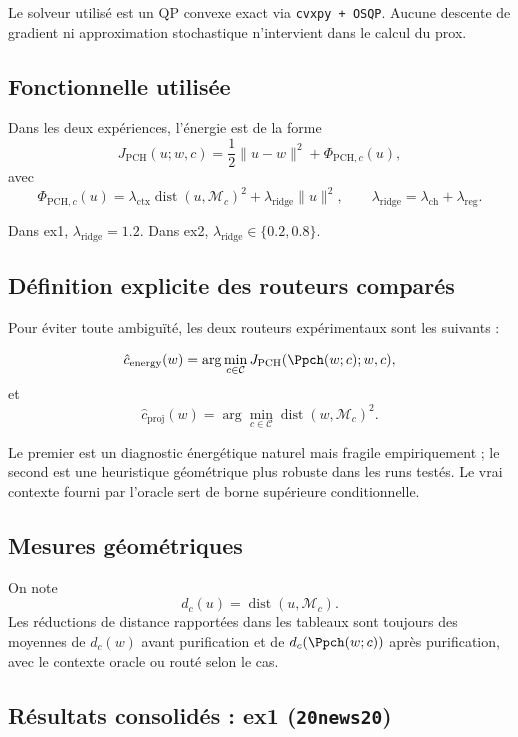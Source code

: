 Le solveur utilisé est un QP convexe exact via \texttt{cvxpy + OSQP}. Aucune descente de gradient ni approximation stochastique n’intervient dans le calcul du prox.

\subsection{Fonctionnelle utilisée}

Dans les deux expériences, l’énergie est de la forme
\[
J_{\mathrm{PCH}}(u;w,c)
=
\frac12\|u-w\|^2+\Phi_{\mathrm{PCH},c}(u),
\]
avec
\[
\Phi_{\mathrm{PCH},c}(u)
=
\lambda_{\mathrm{ctx}}\operatorname{dist}(u,\mathcal M_c)^2
+\lambda_{\mathrm{ridge}}\|u\|^2,
\qquad
\lambda_{\mathrm{ridge}}=\lambda_{\mathrm{ch}}+\lambda_{\mathrm{reg}}.
\]

Dans ex1, \(\lambda_{\mathrm{ridge}}=1.2\). Dans ex2, \(\lambda_{\mathrm{ridge}}\in\{0.2,0.8\}\).

\subsection{Définition explicite des routeurs comparés}

Pour éviter toute ambiguïté, les deux routeurs expérimentaux sont les suivants :

\[
\hat c_{\mathrm{energy}}(w)
=
\arg\min_{c\in\mathcal C}
J_{\mathrm{PCH}}(\Ppch(w;c);w,c),
\]
et
\[
\hat c_{\mathrm{proj}}(w)
=
\arg\min_{c\in\mathcal C}
\operatorname{dist}(w,\mathcal M_c)^2.
\]

Le premier est un diagnostic énergétique naturel mais fragile empiriquement ; le second est une heuristique géométrique plus robuste dans les runs testés. Le vrai contexte fourni par l’oracle sert de borne supérieure conditionnelle.

\subsection{Mesures géométriques}

On note
\[
d_c(u)=\operatorname{dist}(u,\mathcal M_c).
\]
Les réductions de distance rapportées dans les tableaux sont toujours des moyennes de \(d_c(w)\) avant purification et de \(d_c(\Ppch(w;c))\) après purification, avec le contexte oracle ou routé selon le cas.

\subsection{Résultats consolidés : ex1 (\texttt{20news20})}

